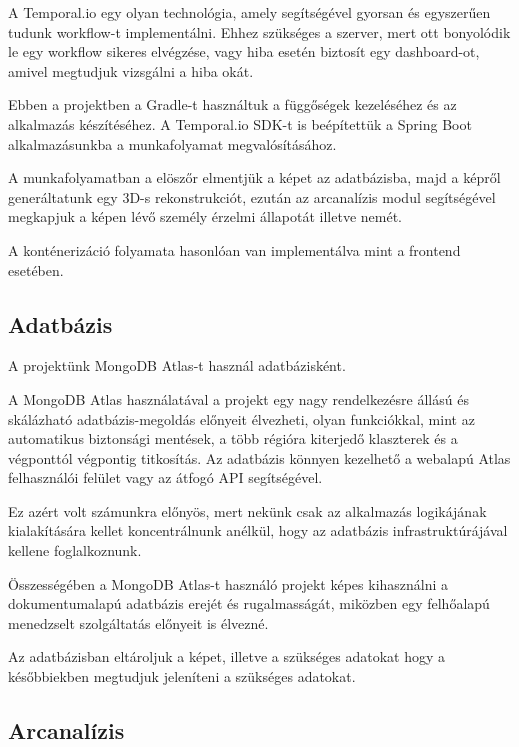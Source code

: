 \documentclass[12pt,a4]{article}
\begin{document}
            A Temporal.io egy olyan technológia, amely segítségével gyorsan és
        	egyszerűen tudunk workflow-t implementálni. Ehhez szükséges a szerver,
        	mert ott bonyolódik le egy workflow sikeres elvégzése, vagy hiba esetén
        	biztosít egy dashboard-ot, amivel megtudjuk vizsgálni a hiba okát. 

            Ebben a projektben a Gradle-t használtuk a függőségek kezeléséhez és az alkalmazás készítéséhez. A Temporal.io SDK-t is beépítettük a Spring Boot alkalmazásunkba a munkafolyamat megvalósításához.

            A munkafolyamatban a elöszőr elmentjük a képet az adatbázisba, majd a képről generáltatunk egy 3D-s rekonstrukciót, ezután az arcanalízis modul segítségével megkapjuk a képen lévő személy érzelmi állapotát illetve nemét.

            A konténerizáció folyamata hasonlóan van implementálva mint a frontend esetében.
         
        \subsection{Adatbázis}
            A projektünk MongoDB Atlas-t használ adatbázisként.

            A MongoDB Atlas használatával a projekt egy nagy rendelkezésre állású és skálázható adatbázis-megoldás előnyeit élvezheti, olyan funkciókkal, mint az automatikus biztonsági mentések, a több régióra kiterjedő klaszterek és a végponttól végpontig titkosítás. Az adatbázis könnyen kezelhető a webalapú Atlas felhasználói felület vagy az átfogó API segítségével. 
            
            Ez azért volt számunkra előnyös, mert nekünk csak az alkalmazás logikájának kialakítására kellet koncentrálnunk anélkül, hogy az adatbázis infrastruktúrájával kellene foglalkoznunk.

            Összességében a MongoDB Atlas-t használó projekt képes kihasználni a dokumentumalapú adatbázis erejét és rugalmasságát, miközben egy felhőalapú menedzselt szolgáltatás előnyeit is élvezné.

            Az adatbázisban eltároljuk a képet, illetve a szükséges adatokat hogy a későbbiekben megtudjuk jeleníteni a szükséges adatokat.
            
        \subsection{Arcanalízis}
\end{document}

